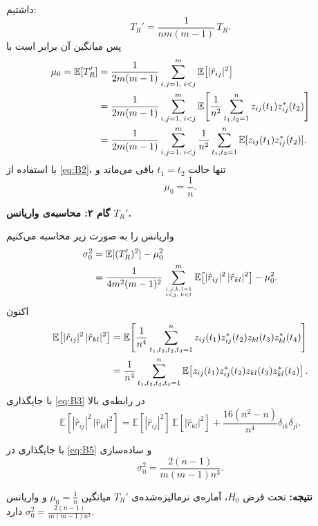 \begin{اثبات}
	داشتیم‌:
	\[
	T_{R}'=\frac{1}{nm(m-1)}\,T_{R}.
	\]
	پس میانگین آن برابر است با
	\begin{align}
		\mu_{0}=\mathbb{E}[T_{R}']
		&=\frac{1}{2m(m-1)}\sum_{i,j=1,\; i<j}^{m}\mathbb{E}\!\left[|\hat r_{ij}|^{2}\right] \notag \\
		&=\frac{1}{2m(m-1)}\sum_{i,j=1,\; i<j}^{m}
		\mathbb{E}\!\left[\frac{1}{n^{2}}\sum_{t_{1},t_{2}=1}^{n}z_{ij}(t_{1})z_{ij}^{*}(t_{2})\right] \notag \\
		&=\frac{1}{2m(m-1)}\sum_{i,j=1,\; i<j}^{m}\frac{1}{n^{2}}\sum_{t_{1},t_{2}=1}^{n}\mathbb{E}[z_{ij}(t_{1})z_{ij}^{*}(t_{2})]. \label{eq:B4}
	\end{align}
	با استفاده از \eqref{eq:B2}، تنها حالت $t_{1}=t_{2}$ باقی می‌ماند و
	\[
	\mu_{0}=\frac{1}{n}.
	\]
	
	\medskip
	\noindent\textbf{گام ۲: محاسبه‌ی واریانس $T_{R}'$.}
	
	واریانس را به صورت زیر محاسبه می‌کنیم
	\begin{align}
		\sigma_{0}^{2}&=\mathbb{E}[(T_{R}')^{2}]-\mu_{0}^{2} \notag \\
		&=\frac{1}{4m^{2}(m-1)^{2}}
		\sum_{i,j,k,l=1 \atop i<j,\;k<l}^{m}\mathbb{E}\!\left[|\hat r_{ij}|^{2}\,|\hat r_{kl}|^{2}\right]-\mu_{0}^{2}. \label{eq:B5}
	\end{align}
	اکنون
	\begin{align}
		\mathbb{E}\!\left[|\hat r_{ij}|^{2}\,|\hat r_{kl}|^{2}\right]
		&=\mathbb{E}\!\left[\frac{1}{n^{4}}\sum_{t_{1},t_{2},t_{3},t_{4}=1}^{n}
		z_{ij}(t_{1})z_{ij}^{*}(t_{2})z_{kl}(t_{3})z_{kl}^{*}(t_{4})\right] \notag \\
		&=\frac{1}{n^{4}}\sum_{t_{1},t_{2},t_{3},t_{4}=1}^{n}
		\mathbb{E}\!\left[z_{ij}(t_{1})z_{ij}^{*}(t_{2})z_{kl}(t_{3})z_{kl}^{*}(t_{4})\right]. \label{eq:B6}
	\end{align}
	با جایگذاری \eqref{eq:B3} در رابطه‌ی بالا
	\begin{equation}
	\mathbb{E}\!\left[|\hat r_{ij}|^{2}\,|\hat r_{kl}|^{2}\right]
	=\mathbb{E}[|\hat r_{ij}|^{2}]\,\mathbb{E}[|\hat r_{kl}|^{2}]
	+\frac{16(n^{2}-n)}{n^{4}}\delta_{ik}\delta_{jl}. \tag{92}
	\end{equation}
	
	با جایگذاری در \eqref{eq:B5} و ساده‌سازی 
	\begin{equation}
	\sigma_{0}^{2}=\frac{2(n-1)}{m(m-1)n^{3}}. \tag{93}
	\end{equation}
	
	\medskip
	\noindent\textbf{نتیجه:}  
	تحت فرض $H_{0}$، آماره‌ی نرمالیزه‌شده‌ی $T_{R}'$ میانگین
	$
	\mu_{0}=\tfrac{1}{n}
	$
	و واریانس
	$
	\sigma_{0}^{2}=\tfrac{2(n-1)}{m(m-1)n^{3}}
	$
	دارد.
		
\end{اثبات}

